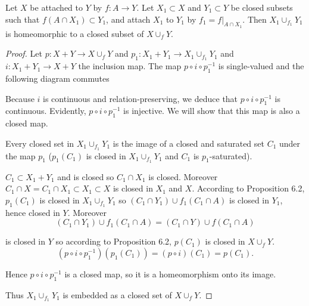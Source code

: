 \begin{proposition}{6.4}
	Let \( X \) be attached to \( Y \) by \( f: A \to Y \). Let \( X_{1} \subset X \) and \( Y_{1} \subset Y \) be closed subsets such that \( f(A \cap X_{1}) \subset Y_{1} \), and attach \( X_{1} \) to \( Y_{1} \) by \( f_{1} = f\vert_{A \cap X_{1}} \). Then \( X_{1} \cup_{f_{1}} Y_{1} \) is homeomorphic to a closed subset of \( X \cup_{f} Y \).
\end{proposition}

\begin{proof}
	Let \( p: X + Y \to X \cup_{f} Y \) and \( p_{1}: X_{1} + Y_{1} \to X_{1} \cup_{f_{1}} Y_{1} \) and \( i: X_{1} + Y_{1} \to X + Y \) the inclusion map. The map \( p \circ i \circ p_{1}^{-1} \) is single-valued and the following diagram commutes
	\begin{figure}[htp]
		\centering
	\end{figure}

	Because \( i \) is continuous and relation-preserving, we deduce that \( p \circ i \circ p_{1}^{-1} \) is continuous. Evidently, \( p \circ i \circ p_{1}^{-1} \) is injective. We will show that this map is also a closed map.

	Every closed set in \( X_{1} \cup_{f_{1}} Y_{1} \) is the image of a closed and saturated set \( C_{1} \) under the map \( p_{1} \) (\(p_{1}(C_{1})\) is closed in \( X_{1} \cup_{f_{1}} Y_{1} \) and \(C_{1}\) is \(p_{1}\)-saturated).

	\( C_{1} \subset X_{1} + Y_{1} \) and is closed so \( C_{1} \cap X_{1} \) is closed. Moreover \( C_{1} \cap X = C_{1} \cap X_{1} \subset X_{1} \subset X \) is closed in \( X_{1} \) and \( X \). According to Proposition 6.2, \( p_{1}(C_{1}) \) is closed in \( X_{1} \cup_{f_{1}} Y_{1} \) so \( (C_{1} \cap Y_{1}) \cup f_{1}(C_{1} \cap A) \) is closed in \( Y_{1} \), hence closed in \( Y \). Moreover
	\[
		(C_{1} \cap Y_{1}) \cup f_{1}(C_{1} \cap A) = (C_{1} \cap Y) \cup f(C_{1} \cap A)
	\]

	is closed in \( Y \) so according to Proposition 6.2, \( p(C_{1}) \) is closed in \( X \cup_{f} Y \).
	\[
		(p \circ i \circ p_{1}^{-1})(p_{1}(C_{1})) = (p \circ i)(C_{1}) = p(C_{1}).
	\]

	Hence \( p \circ i \circ p_{1}^{-1} \) is a closed map, so it is a homeomorphism onto its image.

	Thus \( X_{1} \cup_{f_{1}} Y_{1} \) is embedded as a closed set of \( X \cup_{f} Y \).
\end{proof}

